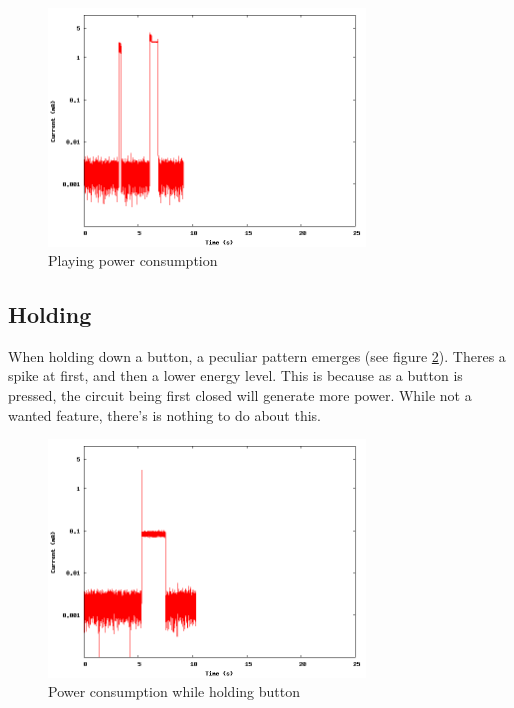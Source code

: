 \begin{figure}[H]
\centering
\includegraphics[width=0.75\textwidth]{data/play.png}
\caption{Playing power consumption}
\label{fig:playpower}
\end{figure}

\subsection{Holding}
When holding down a button, a peculiar pattern emerges (see figure \ref{fig:holdingpower}). 
Theres a spike at first, and then a lower energy level.
This is because as a button is pressed, the circuit being first closed will generate more power.
While not a wanted feature, there's is nothing to do about this.

\begin{figure}[H]
\centering
\includegraphics[width=0.75\textwidth]{data/hold.png}
\caption{Power consumption while holding button}
\label{fig:holdingpower}
\end{figure}
